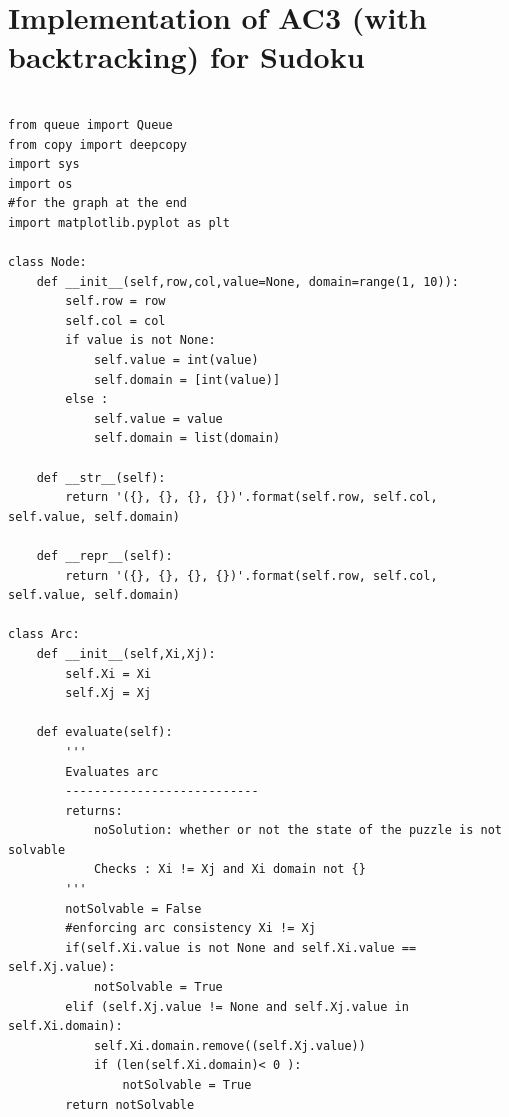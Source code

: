 \documentclass{article}
\begin{document}
\section{Implementation of AC3 (with backtracking) for Sudoku }
\begin{verbatim}

from queue import Queue
from copy import deepcopy
import sys
import os
#for the graph at the end
import matplotlib.pyplot as plt

class Node:
    def __init__(self,row,col,value=None, domain=range(1, 10)):
        self.row = row
        self.col = col
        if value is not None: 
            self.value = int(value)
            self.domain = [int(value)]
        else : 
            self.value = value
            self.domain = list(domain)
        
    def __str__(self):
        return '({}, {}, {}, {})'.format(self.row, self.col, self.value, self.domain)

    def __repr__(self):
        return '({}, {}, {}, {})'.format(self.row, self.col, self.value, self.domain)

class Arc: 
    def __init__(self,Xi,Xj):
        self.Xi = Xi
        self.Xj = Xj 

    def evaluate(self):
        '''
        Evaluates arc
        ---------------------------
        returns:
            noSolution: whether or not the state of the puzzle is not solvable
            Checks : Xi != Xj and Xi domain not {}
        '''
        notSolvable = False 
        #enforcing arc consistency Xi != Xj 
        if(self.Xi.value is not None and self.Xi.value == self.Xj.value):
            notSolvable = True 
        elif (self.Xj.value != None and self.Xj.value in self.Xi.domain):
            self.Xi.domain.remove((self.Xj.value))
            if (len(self.Xi.domain)< 0 ): 
                notSolvable = True
        return notSolvable
\end{verbatim}
\newpage
\end{document}
